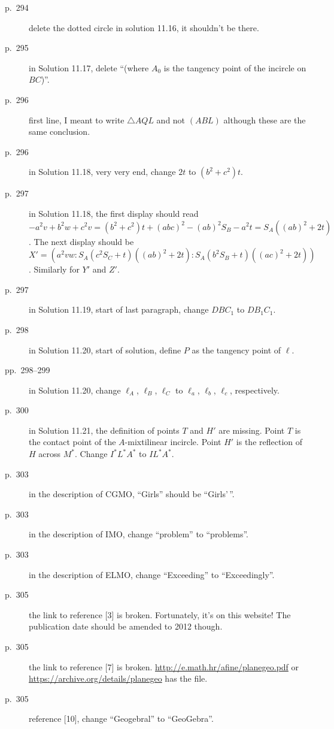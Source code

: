 \documentclass[11pt]{scrartcl}
\begin{document}
\begin{description}
\item[p.\  294] delete the dotted circle in solution 11.16, it shouldn't be there.
\item[p.\  295] in Solution 11.17, delete ``(where $A_0$ is the tangency point of the incircle on $BC$)''.
\item[p.\  296] first line, I meant to write $\triangle{AQL}$ and not $(ABL)$
  although these are the same conclusion.
\item[p.\  296] in Solution 11.18, very very end, change $2t$ to $(b^2+c^2)t$.
\item[p.\  297] in Solution 11.18, the first display should read
  $-a^2v + b^2w + c^2v = (b^2+c^2)t + (abc)^2 - (ab)^2S_B - a^2t = S_A ((ab)^2 + 2t)$.
  The next display should be
  $X' = \left( a^2vw : S_A(c^2S_C+t)((ab)^2+2t) : S_A(b^2S_B+t)((ac)^2+2t) \right)$.
  Similarly for $Y'$ and $Z'$.
\item[p.\  297] in Solution 11.19, start of last paragraph, change $DBC_1$ to $DB_1C_1$.
\item[p.\  298] in Solution 11.20, start of solution, define $P$ as the tangency point of $\ell$.
\item[pp.\  298--299] in Solution 11.20, change $\ell_A$, $\ell_B$, $\ell_C$
  to $\ell_a$, $\ell_b$, $\ell_c$, respectively.
\item[p.\  300] in Solution 11.21, the definition of points $T$ and $H'$ are missing.
  Point $T$ is the contact point of the $A$-mixtilinear incircle.
  Point $H'$ is the reflection of $H$ across $M^\ast$.
  Change $I^\ast L^\ast A^\ast$ to $IL^\ast A^\ast$.
\item[p.\  303] in the description of CGMO, ``Girls'' should be ``Girls'\,''.
\item[p.\  303] in the description of IMO, change ``problem'' to ``problems''.
\item[p.\  303] in the description of ELMO, change ``Exceeding'' to ``Exceedingly''.
\item[p.\  305] the link to reference [3] is broken. Fortunately, it's on this website!
  The publication date should be amended to 2012 though.
\item[p.\  305] the link to reference [7] is broken. \url{http://e.math.hr/afine/planegeo.pdf}
  or \url{https://archive.org/details/planegeo} has the file.
\item[p.\  305] reference [10], change ``Geogebral'' to ``GeoGebra''.
\end{description}
\end{document}
